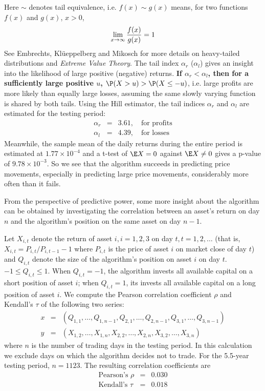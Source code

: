 \documentclass[12pt]{article}
\begin{document}
Here $\sim$ denotes tail equivalence, i.e. $f(x) \sim g(x)$ means, for
two functions $f(x)$ and $g(x)$, $x > 0$,
\[
  \lim_{x \to \infty} {f(x) \over g(x)} = 1
\]
See Embrechts, Kl\"ueppelberg and Mikosch
\cite{embrechts:klueppelberg:mikosch:1997} for more details on
heavy-tailed distributions and {\it Extreme Value Theory}. The tail
index $\alpha_r$ ($\alpha_l$) gives an insight into the likelihood
of large positive (negative) returns. {\bf If $\alpha_r < \alpha_l$,
  then for a sufficiently large positive $u$, $\P(X > u) > \P(X \leq -u)$},
i.e. large profits are more likely than equally large losses,
assuming the same slowly varying function is shared by both
tails. Using the Hill estimator, the tail indices $\alpha_r$ and
$\alpha_l$ are estimated for the testing period:
\begin{eqnarray*}
  \alpha_r &=& 3.61, \quad \text{for profits} \\
  \alpha_l &=& 4.39, \quad \text{for losses}
\end{eqnarray*}
Meanwhile, the sample mean of the daily returns during the entire
period is estimated at $1.77 \times 10^{-4}$ and a t-test of $\E X =
0$ against $\E X \neq 0$ gives a p-value of $9.78 \times 10^{-3}$.
So we see that the algorithm succeeds in predicting price movements,
especially in predicting large price movements, considerably more
often than it fails.

From the perspective of predictive power, some more insight about the
algorithm can be obtained by investigating the correlation between an
asset's return on day $n$ and the algorithm's position on the same
asset on day $n-1$.

Let $X_{i, t}$ denote the return of asset $i, i=1,2,3$ on day $t,
t=1,2, \dots$ (that is, $X_{i,t} = P_{i,t}/P_{i, t-1} - 1$ where
$P_{i,t}$ is the price of asset $i$ on market close of day $t$) and $Q_{i, t}$
denote the size of the algorithm's position on asset $i$ on day
$t$. $-1 \leq Q_{i,t} \leq 1$. When $Q_{i,t} = -1$, the algorithm
invests all available capital on a short position of asset $i$; when
$Q_{i,t} = 1$, its invests all available capital on a long position of
asset $i$. We compute the Pearson correlation coefficient $\rho$ and
Kendall's $\tau$ of the following two series:
\begin{eqnarray*}
  x &=& (Q_{1, 1}, \dots, Q_{1, n-1}, Q_{2, 1}, \dots, Q_{2, n-1}, Q_{3,
        1}, \dots, Q_{3, n-1}) \\
  y &=& (X_{1, 2}, \dots, X_{1, n}, X_{2, 2}, \dots, X_{2, n}, X_{3,
        2}, \dots, X_{3, n})
\end{eqnarray*}
where $n$ is the number of trading days in the testing period. In this
calculation we exclude days on which the algorithm decides not to
trade. For the 5.5-year testing period, $n=1123$. The resulting
correlation coefficients are
\begin{eqnarray*}
  \text{Pearson's } \rho &=& 0.030 \\
  \text{Kendall's } \tau &=& 0.018
\end{eqnarray*}
\end{document}
